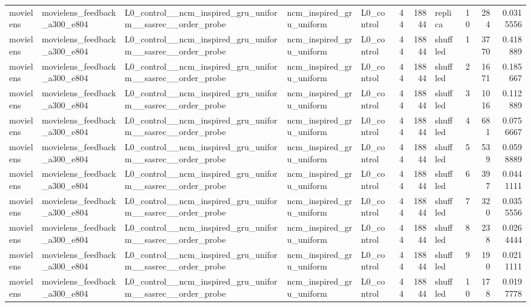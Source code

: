 \begin{table}[htbp!]
\begin{tabular}{lllllrrlrrr}
movielens & movielens\_feedback\_a300\_e804 & L0\_control\_\_ncm\_inspired\_gru\_uniform\_\_sasrec\_\_order\_probe & ncm\_inspired\_gru\_uniform & L0\_control & 44 & 18844 & replica & 10 & 284 & 0.0315556 \\
movielens & movielens\_feedback\_a300\_e804 & L0\_control\_\_ncm\_inspired\_gru\_uniform\_\_sasrec\_\_order\_probe & ncm\_inspired\_gru\_uniform & L0\_control & 44 & 18844 & shuffled & 1 & 3770 & 0.418889 \\
movielens & movielens\_feedback\_a300\_e804 & L0\_control\_\_ncm\_inspired\_gru\_uniform\_\_sasrec\_\_order\_probe & ncm\_inspired\_gru\_uniform & L0\_control & 44 & 18844 & shuffled & 2 & 1671 & 0.185667 \\
movielens & movielens\_feedback\_a300\_e804 & L0\_control\_\_ncm\_inspired\_gru\_uniform\_\_sasrec\_\_order\_probe & ncm\_inspired\_gru\_uniform & L0\_control & 44 & 18844 & shuffled & 3 & 1016 & 0.112889 \\
movielens & movielens\_feedback\_a300\_e804 & L0\_control\_\_ncm\_inspired\_gru\_uniform\_\_sasrec\_\_order\_probe & ncm\_inspired\_gru\_uniform & L0\_control & 44 & 18844 & shuffled & 4 & 681 & 0.0756667 \\
movielens & movielens\_feedback\_a300\_e804 & L0\_control\_\_ncm\_inspired\_gru\_uniform\_\_sasrec\_\_order\_probe & ncm\_inspired\_gru\_uniform & L0\_control & 44 & 18844 & shuffled & 5 & 539 & 0.0598889 \\
movielens & movielens\_feedback\_a300\_e804 & L0\_control\_\_ncm\_inspired\_gru\_uniform\_\_sasrec\_\_order\_probe & ncm\_inspired\_gru\_uniform & L0\_control & 44 & 18844 & shuffled & 6 & 397 & 0.0441111 \\
movielens & movielens\_feedback\_a300\_e804 & L0\_control\_\_ncm\_inspired\_gru\_uniform\_\_sasrec\_\_order\_probe & ncm\_inspired\_gru\_uniform & L0\_control & 44 & 18844 & shuffled & 7 & 320 & 0.0355556 \\
movielens & movielens\_feedback\_a300\_e804 & L0\_control\_\_ncm\_inspired\_gru\_uniform\_\_sasrec\_\_order\_probe & ncm\_inspired\_gru\_uniform & L0\_control & 44 & 18844 & shuffled & 8 & 238 & 0.0264444 \\
movielens & movielens\_feedback\_a300\_e804 & L0\_control\_\_ncm\_inspired\_gru\_uniform\_\_sasrec\_\_order\_probe & ncm\_inspired\_gru\_uniform & L0\_control & 44 & 18844 & shuffled & 9 & 190 & 0.0211111 \\
movielens & movielens\_feedback\_a300\_e804 & L0\_control\_\_ncm\_inspired\_gru\_uniform\_\_sasrec\_\_order\_probe & ncm\_inspired\_gru\_uniform & L0\_control & 44 & 18844 & shuffled & 10 & 178 & 0.0197778 \\

\end{tabular}
\end{table}
